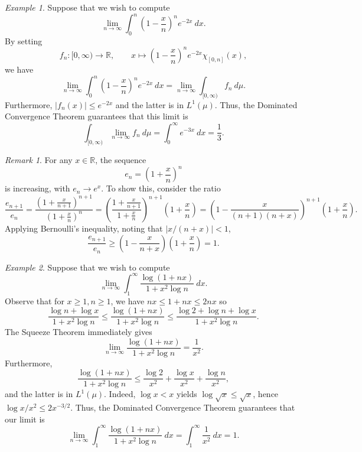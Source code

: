 \documentclass[11pt]{article}
\newcommand{\R}{\mathbb{R}}
\theoremstyle{definition}
\theoremstyle{remark}
\newtheorem*{remark}{Remark}
\newtheorem*{example}{Example}
\numberwithin{equation}{section}
\begin{document}
    \begin{example}
        Suppose that we wish to compute \[
            \lim_{n \to \infty} \int_0^n \left( 1 - \frac{x}{n} \right)^n
            e^{-2x}\:dx.
        \] By setting \[
            f_n\colon [0, \infty) \to \R, \qquad x \mapsto \left( 1 - \frac{x}{n}
            \right)^n e^{-2x}\chi_{[0, n]}(x),
        \] we have \[
            \lim_{n \to \infty} \int_0^n \left( 1 - \frac{x}{n} \right)^n
            e^{-2x}\:dx = \lim_{n \to \infty} \int_{[0, \infty)} f_n\:d\mu.
        \] Furthermore, $|f_n(x)| \leq e^{-2x}$ and the latter is in $L^1(\mu)$.
        Thus, the Dominated Convergence Theorem guarantees that this limit is \[
            \int_{[0, \infty)} \lim_{n \to \infty} f_n\:d\mu = \int_0^\infty
            e^{-3x}\:dx = \frac{1}{3}.
        \]
        \begin{remark}
            For any $x \in \R$, the sequence \[
                e_n = \left(1 + \frac{x}{n}\right)^n
            \] is increasing, with $e_n \to e^x$. To show this, consider the ratio \[
                \frac{e_{n + 1}}{e_n} = \frac{(1 + \frac{x}{n + 1})^{n + 1}}{(1 +
                \frac{x}{n})^n}
                = \left(\frac{1 + \frac{x}{n + 1}}{1 + \frac{x}{n}}\right)^{n + 1}
                \left(1 + \frac{x}{n}\right)
                = \left(1 - \frac{x}{(n + 1)(n + x)}\right)^{n + 1} \left(1 +
                \frac{x}{n}\right).
            \]
            Applying Bernoulli's inequality, noting that $|x / (n + x)| < 1$, \[
                \frac{e_{n + 1}}{e_n} \geq \left(1 - \frac{x}{n + x}\right)\left(1 +
                \frac{x}{n}\right) = 1.
            \]
        \end{remark}
    \end{example}

    \begin{example}
        Suppose that we wish to compute \[
            \lim_{n \to \infty} \int_1^\infty \frac{\log(1 + nx)}{1 + x^2\log{n}}\:dx.
        \] Observe that for $x\geq 1, n\geq 1$, we have $nx \leq 1 + nx \leq 2nx$ so
        \[
            \frac{\log{n} + \log{x}}{1 + x^2\log{n}} \leq \frac{\log(1 + nx)}{1 +
            x^2\log{n}} \leq \frac{\log{2} + \log{n} + \log{x}}{1 + x^2\log{n}}.
        \] The Squeeze Theorem immediately gives \[
            \lim_{n \to \infty} \frac{\log(1 + nx)}{1 + x^2\log{n}} = \frac{1}{x^2}.
        \] Furthermore, \[
            \frac{\log(1 + nx)}{1 + x^2\log{n}} \leq \frac{\log{2}}{x^2} +
            \frac{\log{x}}{x^2} + \frac{\log{n}}{x^2},
        \] and the latter is in $L^1(\mu)$. Indeed, $\log{x} < x$ yields
        $\log{\sqrt{x}} \leq \sqrt{x}$, hence $\log{x}/x^2 \leq 2 x^{-3 / 2}$. Thus,
        the Dominated Convergence Theorem guarantees that our limit is \[
            \lim_{n \to \infty} \int_1^\infty \frac{\log(1 + nx)}{1 + x^2\log{n}}\:dx
            = \int_1^\infty \frac{1}{x^2}\:dx = 1.
        \]
    \end{example}
\end{document}
